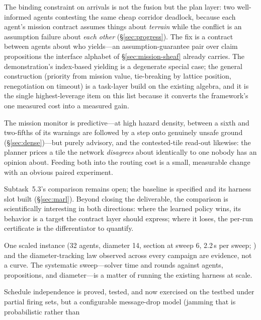\documentclass[11pt]{article}
\theoremstyle{definition}
\theoremstyle{remark}
\begin{document}
\begin{description}[leftmargin=1.6em, style=nextline]
\item[The yielding contract.]
The binding constraint on arrivals is not the fusion but the plan layer: two well-informed
agents contesting the same cheap corridor deadlock, because each agent's mission contract
assumes things about \emph{terrain} while the conflict is an assumption failure about
\emph{each other} (\S\ref{sec:progress}).
The fix is a contract between agents about who yields---an assumption-guarantee pair over claim
propositions the interface alphabet of \S\ref{sec:mission-sheaf} already carries.
The demonstration's index-based yielding is a degenerate special case; the general construction
(priority from mission value, tie-breaking by lattice position, renegotiation on timeout) is a
task-layer build on the existing algebra, and it is the single highest-leverage item on this
list because it converts the framework's one measured cost into a measured gain.
\item[Actionable read-outs.]
The mission monitor is predictive---at high hazard density, between a sixth and two-fifths of
its warnings are followed by a step onto genuinely unsafe ground (\S\ref{sec:dense})---but
purely advisory, and the contested-tile read-out likewise: the planner prices a tile the
network \emph{disagrees} about identically to one nobody has an opinion about.
Feeding both into the routing cost is a small, measurable change with an obvious paired
experiment.
\item[The MARL baseline.]
Subtask~5.3's comparison remains open; the baseline is specified and its harness slot built
(\S\ref{sec:marl}).
Beyond closing the deliverable, the comparison is scientifically interesting in both
directions: where the learned policy wins, its behavior is a target the contract layer should
express; where it loses, the per-run certificate is the differentiator to quantify.
\item[A scaling curve.]
One scaled instance (32 agents, diameter 14, section at sweep 6, 2.2\,s per sweep;
) and the diameter-tracking law observed across every campaign are
evidence, not a curve.
The systematic sweep---solver time and rounds against agents, propositions, and diameter---is a
matter of running the existing harness at scale.
\item[Denial models on hardware.]
Schedule independence is proved, tested, and now exercised on the testbed under partial firing
sets, but a configurable message-drop model (jamming that is probabilistic rather than

\end{description}
\end{document}
